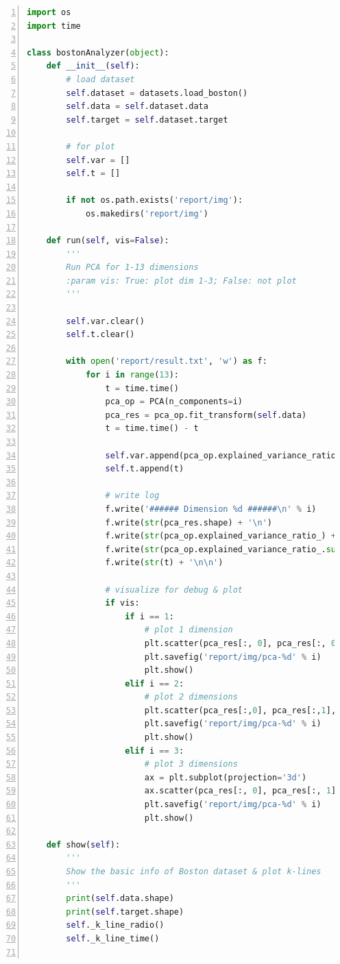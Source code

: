 \documentclass[12pt,a4paper]{article}
\theoremstyle{definition}
\begin{document}
\begin{appendix}
\begin{lstlisting}[language=Python,
	numbers=left,
	keywordstyle=\color{blue!70},
	frame=shadowbox,
	breaklines=True]
import os
import time

class bostonAnalyzer(object):
    def __init__(self):
        # load dataset
        self.dataset = datasets.load_boston()
        self.data = self.dataset.data
        self.target = self.dataset.target
        
        # for plot
        self.var = []
        self.t = []

        if not os.path.exists('report/img'):
            os.makedirs('report/img')

    def run(self, vis=False):
        '''
        Run PCA for 1-13 dimensions
        :param vis: True: plot dim 1-3; False: not plot
        '''

        self.var.clear()
        self.t.clear()

        with open('report/result.txt', 'w') as f:
            for i in range(13):
                t = time.time()
                pca_op = PCA(n_components=i)
                pca_res = pca_op.fit_transform(self.data)
                t = time.time() - t

                self.var.append(pca_op.explained_variance_ratio_.sum())
                self.t.append(t)

                # write log
                f.write('###### Dimension %d ######\n' % i)
                f.write(str(pca_res.shape) + '\n')
                f.write(str(pca_op.explained_variance_ratio_) + '\n')
                f.write(str(pca_op.explained_variance_ratio_.sum()) + '\n')
                f.write(str(t) + '\n\n')

                # visualize for debug & plot
                if vis:
                    if i == 1:
                        # plot 1 dimension
                        plt.scatter(pca_res[:, 0], pca_res[:, 0], s=14, c=self.target)
                        plt.savefig('report/img/pca-%d' % i)
                        plt.show()
                    elif i == 2:
                        # plot 2 dimensions
                        plt.scatter(pca_res[:,0], pca_res[:,1], s=8, c=self.target)
                        plt.savefig('report/img/pca-%d' % i)
                        plt.show()
                    elif i == 3:
                        # plot 3 dimensions
                        ax = plt.subplot(projection='3d')
                        ax.scatter(pca_res[:, 0], pca_res[:, 1], pca_res[:, 2], s=8, c=self.target)
                        plt.savefig('report/img/pca-%d' % i)
                        plt.show()

    def show(self):
        '''
        Show the basic info of Boston dataset & plot k-lines
        '''
        print(self.data.shape)
        print(self.target.shape)
        self._k_line_radio()
        self._k_line_time()


\end{lstlisting}
\end{appendix}
\end{document}
